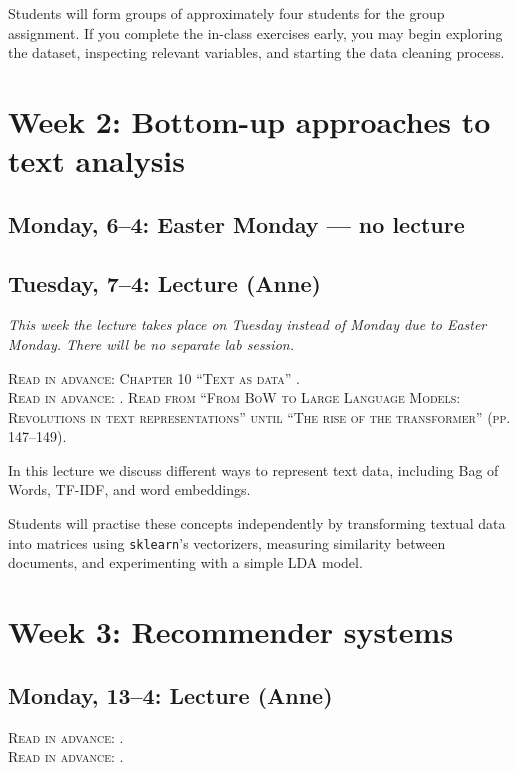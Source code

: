 Students will form groups of approximately four students for the group assignment. If you complete the in-class exercises early, you may begin exploring the dataset, inspecting relevant variables, and starting the data cleaning process.

\section*{Week 2: Bottom-up approaches to text analysis}

\subsection*{Monday, 6--4: Easter Monday --- no lecture}

\subsection*{Tuesday, 7--4: Lecture (Anne)}

\emph{This week the lecture takes place on Tuesday instead of Monday due to Easter Monday. There will be no separate lab session.}

\textsc{ Read in advance: Chapter 10 “Text as data” \cite{van_atteveldt_computational_2022}.}\\
\textsc{ Read in advance: \cite{kroon2024advancing}. Read from “From BoW to Large Language Models: Revolutions in text representations” until “The rise of the transformer” (pp. 147–149).}

In this lecture we discuss different ways to represent text data, including Bag of Words, TF-IDF, and word embeddings.

Students will practise these concepts independently by transforming textual data into matrices using \texttt{sklearn}'s vectorizers, measuring similarity between documents, and experimenting with a simple LDA model.

\section*{Week 3: Recommender systems}

\subsection*{Monday, 13--4: Lecture (Anne)} 

\textsc{ Read in advance: \cite{Moller2018}.}\\
\textsc{ Read in advance: \cite{Loecherbach2020}.}\\


